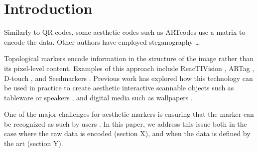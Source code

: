\section{Introduction}

Similarly to QR codes, some aesthetic codes such as ARTcodes \cite{artcodes} use a matrix to encode the data. Other authors have employed steganography \dots

Topological markers encode information in the structure of the image rather than its pixel-level content. Examples of this approach include ReacTIVision \cite{reactivision}, ARTag \cite{ARTag}, D-touch \cite{dtouch0}\cite{dtouch1}\cite{dtouch2}, and Seedmarkers \cite{seedmarkers}. Previous work has explored how this technology can be used in practice to create aesthetic interactive scannable objects such as tableware \cite{tableware} or speakers \cite{seedmarkers}, and digital media such as wallpapers \cite{interactiveWallpapers}.

One of the major challenges for aesthetic markers is ensuring that the marker can be recognized as such by users \cite{recognizingPresence}. In this paper, we address this issue both in the case where the raw data is encoded (section X), and when the data is defined by the art (section Y).
